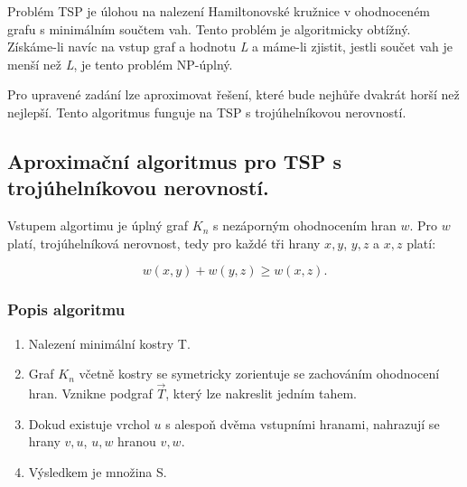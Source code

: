Problém TSP je úlohou na nalezení Hamiltonovské kružnice v ohodnoceném grafu s minimálním součtem vah.
Tento problém je algoritmicky obtížný.
Získáme-li navíc na vstup graf a hodnotu \textit{L} a máme-li zjistit, jestli součet vah je menší než \textit{L}, je tento problém NP-úplný.

Pro upravené zadání lze aproximovat řešení, které bude nejhůře dvakrát horší než nejlepší.
Tento algoritmus funguje na TSP s trojúhelníkovou nerovností.

\subsection{Aproximační algoritmus pro TSP s trojúhelníkovou nerovností.}

Vstupem algortimu je úplný graf $K_n$ s nezáporným ohodnocením hran $w$.
Pro $w$ platí, trojúhelníková nerovnost, tedy pro každé tři hrany ${x, y}$, ${y, z}$ a ${x, z}$ platí:

$$
    w({x,y}) + w({y, z}) \geq w({x, z}).
$$


\subsubsection{Popis algoritmu}

\begin{enumerate}
    \item Nalezení minimální kostry T.
    \item Graf $K_n$ včetně kostry se symetricky zorientuje se zachováním ohodnocení hran.
    Vznikne podgraf $\vec{T}$, který lze nakreslit jedním tahem.
    \item Dokud existuje vrchol $u$ s alespoň dvěma vstupními hranami, nahrazují se hrany ${v, u}$, ${u, w}$ hranou ${v, w}$.
    \item Výsledkem je množina S.
\end{enumerate}


